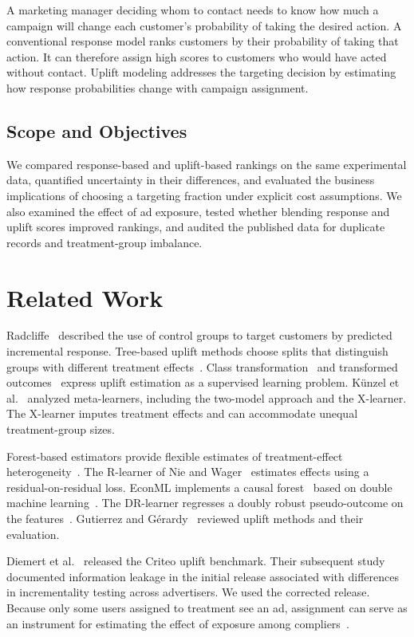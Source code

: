 \documentclass[conference]{IEEEtran}
\begin{document}
A marketing manager deciding whom to contact needs to know how much a
campaign will change each customer's probability of taking the desired
action. A conventional response model ranks customers by their
probability of taking that action. It can therefore assign high scores
to customers who would have acted without contact. Uplift modeling
addresses the targeting decision by estimating how response probabilities
change with campaign assignment.

\subsection{Scope and Objectives}

We compared response-based and uplift-based rankings on the same
experimental data, quantified uncertainty in their differences, and
evaluated the business implications of choosing a targeting fraction
under explicit cost assumptions. We also examined the effect of ad
exposure, tested whether blending response and uplift scores improved
rankings, and audited the published data for duplicate records and
treatment-group imbalance.

\section{Related Work}

Radcliffe~\cite{radcliffe2007} described the use of control groups to
target customers by predicted incremental response. Tree-based uplift
methods choose splits that distinguish groups with different treatment
effects~\cite{rzepakowski2012}. Class transformation~\cite{jaskowski2012}
and transformed outcomes~\cite{athey2016} express uplift estimation as a
supervised learning problem. K\"unzel et al.~\cite{kunzel2019} analyzed
meta-learners, including the two-model approach and the X-learner.
The X-learner imputes treatment effects and can accommodate unequal
treatment-group sizes.

Forest-based estimators provide flexible estimates of treatment-effect
heterogeneity~\cite{wager2018,athey2019}. The R-learner of Nie and
Wager~\cite{nie2021} estimates effects using a residual-on-residual
loss. EconML implements a causal forest~\cite{econml} based on double
machine learning~\cite{chernozhukov2018}. The DR-learner regresses a
doubly robust pseudo-outcome on the features~\cite{kennedy2023}.
Gutierrez and G\'erardy~\cite{gutierrez2017} reviewed uplift methods
and their evaluation.

Diemert et al.~\cite{diemert2018} released the Criteo uplift benchmark.
Their subsequent study~\cite{diemert2021} documented information leakage
in the initial release associated with differences in incrementality
testing across advertisers. We used the corrected release. Because only
some users assigned to treatment see an ad, assignment can serve as an
instrument for estimating the effect of exposure among
compliers~\cite{bloom1984,angrist1996}.
\end{document}
